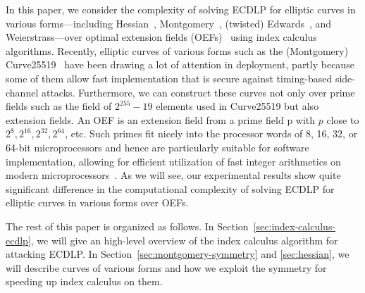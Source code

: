 In this paper, we consider the complexity of solving ECDLP for
elliptic curves in various forms---including
Hessian~\cite{DBLP:conf/ches/Smart01},
Montgomery~\cite{1987-montgomery}, (twisted)
Edwards~\cite{DBLP:journals/iacr/BernsteinL07,DBLP:journals/iacr/BernsteinBJLP08},
and Weierstrass---over optimal extension fields
(OEFs)~\cite{DBLP:conf/crypto/BaileyP98} using index calculus
algorithms.
%
Recently, elliptic curves of various forms such as the (Montgomery)
Curve25519~\cite{DBLP:conf/pkc/Bernstein06} have been drawing a lot of
attention in deployment, partly because some of them allow fast
implementation that is secure against timing-based side-channel
attacks.
%
Furthermore, we can construct these curves not only over prime fields
such as the field of $2^{255} - 19$ elements used in Curve25519 but
also extension fields.
%
An OEF is an extension field from a prime field \F p with $p$ close to
$2^8, 2^{16}, 2^{32}, 2^{64}$, etc.
%
Such primes fit nicely into the processor words of 8, 16, 32, or
64-bit microprocessors and hence are particularly suitable for
software implementation, allowing for efficient utilization of fast
integer arithmetics on modern
microprocessors~\cite{DBLP:conf/crypto/BaileyP98}.
%
As we will see, our experimental results show quite significant
difference in the computational complexity of solving ECDLP for
elliptic curves in various forms over OEFs.

The rest of this paper is organized as follows.
%
In Section~\ref{sec:index-calculus-ecdlp}, we will give an high-level
overview of the index calculus algorithm for attacking ECDLP.
%
In Section~\ref{sec:montgomery-symmetry} and \ref{sec:hessian}, we
will describe curves of various forms and how we exploit the symmetry
for speeding up index calculus on them.
